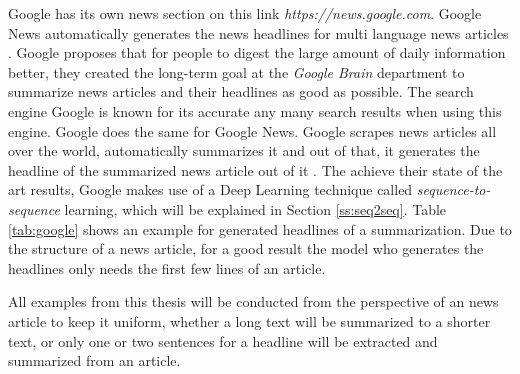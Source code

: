 Google has its own news section on this link \textit{https://news.google.com}. Google News automatically generates the news headlines for multi language news articles \cite{google}. Google proposes that for people to digest the large amount of daily information better, they created the long-term goal at the \textit{Google Brain} department to summarize news articles and their headlines as good as possible. The search engine Google is known for its accurate any many search results when using this engine. Google does the same for Google News. Google scrapes news articles all over the world, automatically summarizes it and out of that, it generates the headline of the summarized news article out of it \cite{google}. 
The achieve their state of the art results, Google makes use of a Deep Learning technique called \textit{sequence-to-sequence} learning, which will be explained in Section \ref{ss:seq2seq}. Table \ref{tab:google} shows an example for generated headlines of a summarization. Due to the structure of a news article, for a good result the model who generates the headlines only needs the first few lines of an article.  

All examples from this thesis will be conducted from the perspective of an news article to keep it uniform, whether a long text will be summarized to a shorter text, or only one or two sentences for a headline will be extracted and summarized from an article. 


